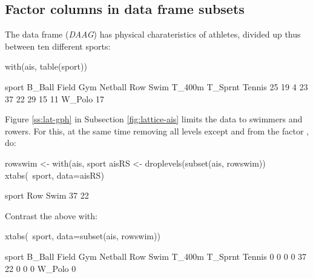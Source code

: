 \subsection{Factor columns in data frame subsets}

The data frame  ({\em DAAG}) has physical charateristics
of athletes, divided up thus between ten different sports:
\begin{fullwidth}
\begin{minipage}[t]{\linewidth}

\begin{Schunk}
\begin{Sinput}
with(ais, table(sport))
\end{Sinput}
\begin{Soutput}
sport
 B_Ball   Field     Gym Netball     Row    Swim  T_400m T_Sprnt  Tennis 
     25      19       4      23      37      22      29      15      11 
 W_Polo 
     17 
\end{Soutput}
\end{Schunk}

\end{minipage}
\end{fullwidth}

Figure \ref{ss:lat-gph} in Subsection \ref{fig:lattice-ais} limits the
data to swimmers and rowers. For this, at the same time removing all
levels except  and  from the factor ,
do:
\begin{Schunk}
\begin{Sinput}
rowswim <- with(ais, sport %
aisRS <- droplevels(subset(ais, rowswim))
xtabs(~sport, data=aisRS)
\end{Sinput}
\begin{Soutput}
sport
 Row Swim 
  37   22 
\end{Soutput}
\end{Schunk}
Contrast the above with:
\begin{fullwidth}

\begin{Schunk}
\begin{Sinput}
xtabs(~sport, data=subset(ais, rowswim))
\end{Sinput}
\begin{Soutput}
sport
 B_Ball   Field     Gym Netball     Row    Swim  T_400m T_Sprnt  Tennis 
      0       0       0       0      37      22       0       0       0 
 W_Polo 
      0 
\end{Soutput}
\end{Schunk}

\end{fullwidth}

